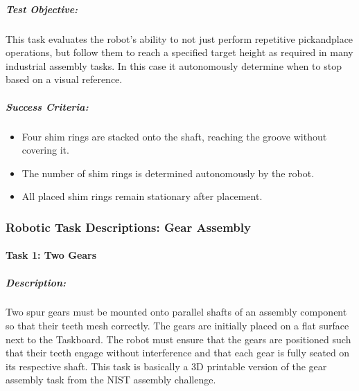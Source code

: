 \documentclass[letterpaper,10pt,english]{sphinxmanual}
\begin{document}
\subparagraph{Test Objective:}
\label{\detokenize{robotic_instructions_pick_and_place:id5}}
\sphinxAtStartPar
This task evaluates the robot’s ability to not just perform repetitive pick\sphinxhyphen{}and\sphinxhyphen{}place operations,
but follow them to reach a specified target height as required in many industrial assembly tasks.
In this case it autonomously determine when to stop based on a visual reference.


\subparagraph{Success Criteria:}
\label{\detokenize{robotic_instructions_pick_and_place:id6}}\begin{itemize}
\item {} 
\sphinxAtStartPar
Four shim rings are stacked onto the shaft, reaching the groove without covering it.

\item {} 
\sphinxAtStartPar
The number of shim rings is determined autonomously by the robot.

\item {} 
\sphinxAtStartPar
All placed shim rings remain stationary after placement.

\end{itemize}

\sphinxstepscope


\subsubsection{Robotic Task Descriptions: Gear Assembly}
\label{\detokenize{robotic_instructions_gear_tasks:robotic-task-descriptions-gear-assembly}}\label{\detokenize{robotic_instructions_gear_tasks::doc}}

\paragraph{Task 1: Two Gears}
\label{\detokenize{robotic_instructions_gear_tasks:task-1-two-gears}}

\subparagraph{Description:}
\label{\detokenize{robotic_instructions_gear_tasks:description}}
\sphinxAtStartPar
Two spur gears must be mounted onto parallel shafts of an assembly component so that their teeth mesh correctly.
The gears are initially placed on a flat surface next to the Taskboard.
The robot must ensure that the gears are positioned such that their teeth engage without interference and that each gear is fully seated on its respective shaft.
This task is basically a 3D printable version of the gear assembly task from the NIST assembly challenge.
\end{document}
